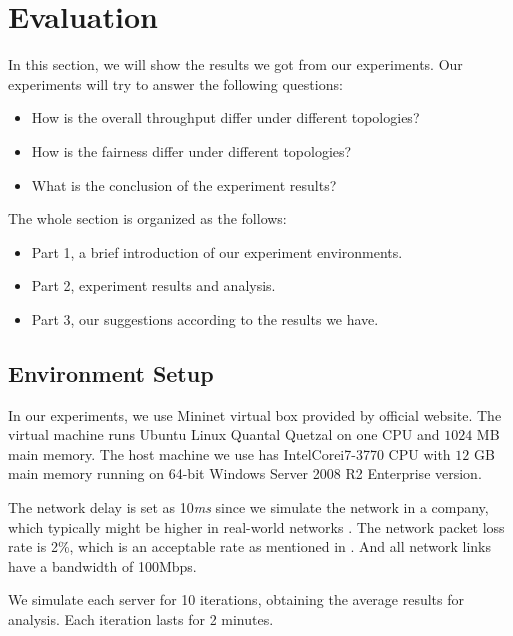 \section{Evaluation} \label{sec:evaluation}

In this section, we will show the results we got from our experiments. Our experiments will try to 
answer the following questions:
\begin{itemize}
    \item How is the overall throughput differ under different topologies?
    \item How is the fairness differ under different topologies?
    \item What is the conclusion of the experiment results?
\end{itemize}

The whole section is organized as the follows:
\begin{itemize}
    \item Part 1, a brief introduction of our experiment environments.
    \item Part 2, experiment results and analysis.
    \item Part 3, our suggestions according to the results we have.
\end{itemize}

\subsection{Environment Setup} \label{subsec:environment}
In our experiments, we use Mininet virtual box provided by official website\cite{Mininet:official}. 
The virtual machine runs Ubuntu Linux Quantal Quetzal on one CPU and $1024$ MB main memory.
The host machine we use has Intel\textregistered Core\texttrademark i7-3770 CPU with $12$ GB main memory running on
64-bit Windows Server 2008 R2 Enterprise version.

The network delay is set as 10{\it ms} since we simulate the network in a company, 
which typically might be higher in real-world networks \cite{NetworkDelay:web}. 
The network packet loss rate is 2\%, which is an acceptable rate as mentioned in \cite{PacketLoss:wiki}.
And all network links have a bandwidth of 100Mbps. 

We simulate each server for 10 iterations, obtaining the average results for 
analysis. Each iteration lasts for 2 minutes.

